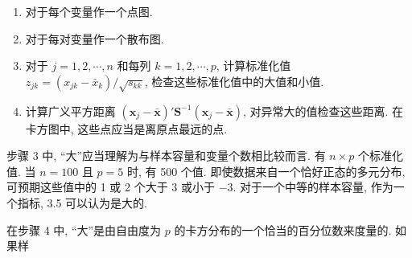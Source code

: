 
\begin{enumerate}[label=\arabic*.,leftmargin=2em,itemsep=2pt]
\item 对于每个变量作一个点图.
\item 对于每对变量作一个散布图.
\item 对于 $j=1,2,\cdots,n$ 和每列 $k=1,2,\cdots,p$, 计算标准化值 $z_{jk}=(x_{jk}-\bar{x}_{k})/\sqrt{s_{kk}}$, 检查这些标准化值中的大值和小值.
\item 计算广义平方距离 $(\mathbf{x}_{j}-\bar{\mathbf{x}})'\mathbf{S}^{-1}(\mathbf{x}_{j}-\bar{\mathbf{x}})$, 对异常大的值检查这些距离. 在卡方图中, 这些点应当是离原点最远的点.
\end{enumerate}

步骤 3 中, “大”应当理解为与样本容量和变量个数相比较而言. 有 $n\times p$ 个标准化值. 当 $n=100$ 且 $p=5$ 时, 有 500 个值. 即使数据来自一个恰好正态的多元分布, 可预期这些值中的 1 或 2 个大于 3 或小于 $-3$. 对于一个中等的样本容量, 作为一个指标, 3.5 可以认为是大的.

在步骤 4 中, “大”是由自由度为 $p$ 的卡方分布的一个恰当的百分位数来度量的. 如果样
